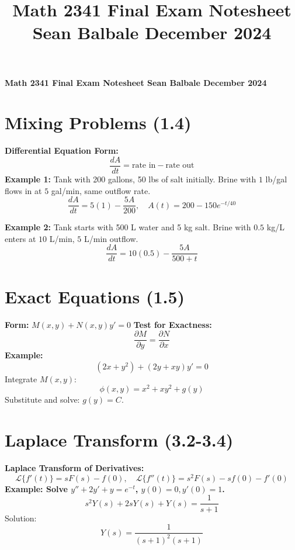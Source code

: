 \documentclass[10pt]{article}
\title{\raggedright \large Math 2341 Final Exam Notesheet \hfill Sean Balbale \hfill December 2024 \vspace{-3em}}
\date{}
\begin{document}
\textbf{Math 2341 Final Exam Notesheet \hfill Sean Balbale \hfill December 2024}
\begin{multicols}{2}
\section*{Mixing Problems (1.4)}
\textbf{Differential Equation Form:}
\[
\frac{dA}{dt} = \text{rate in} - \text{rate out}
\]
\textbf{Example 1:}  
Tank with 200 gallons, 50 lbs of salt initially. Brine with \(1\) lb/gal flows in at \(5\) gal/min, same outflow rate.
\[
\frac{dA}{dt} = 5(1) - \frac{5A}{200}, \quad A(t) = 200 - 150e^{-t/40}
\]

\textbf{Example 2:}  
Tank starts with 500 L water and 5 kg salt. Brine with \(0.5\) kg/L enters at \(10\) L/min, \(5\) L/min outflow.
\[
\frac{dA}{dt} = 10(0.5) - \frac{5A}{500+t}
\]

\section*{Exact Equations (1.5)}
\textbf{Form:} \( M(x, y) + N(x, y)y' = 0 \)  
\textbf{Test for Exactness:}  
\[
\frac{\partial M}{\partial y} = \frac{\partial N}{\partial x}
\]
\textbf{Example:}  
\[
(2x + y^2) + (2y + xy)y' = 0
\]
Integrate \( M(x, y) \):  
\[
\phi(x, y) = x^2 + xy^2 + g(y)
\]
Substitute and solve: \( g(y) = C \).

\section*{Laplace Transform (3.2-3.4)}
\textbf{Laplace Transform of Derivatives:}
\[
\mathcal{L}\{f'(t)\} = sF(s) - f(0), \quad \mathcal{L}\{f''(t)\} = s^2F(s) - sf(0) - f'(0)
\]
\textbf{Example: Solve \( y'' + 2y' + y = e^{-t} \), \( y(0) = 0, y'(0) = 1 \).}  
\[
s^2Y(s) + 2sY(s) + Y(s) = \frac{1}{s+1}
\]
Solution:
\[
Y(s) = \frac{1}{(s+1)^2(s+1)}
\]


\end{multicols}
\end{document}
